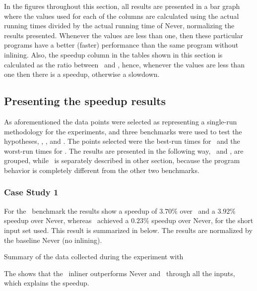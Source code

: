 
In the figures throughout this section, all results are presented in a bar graph where the values used for each of the columns are calculated using the actual running times divided by the actual running time of Never, normalizing the results presented. Whenever the values are less than one, then these particular programs have a better (faster) performance than the same program without inlining. Also, the speedup column in the tables shown in this section is calculated as the ratio between \FDI\ and \llvm, hence, whenever the values are less than one then there is a speedup, otherwise a slowdown.

\subsection{Presenting the speedup results}
\label{sec:speedupresult}

As aforementioned the data points were selected as representing a single-run methodology for the experiments, and three benchmarks were used to test the hypotheses, \bzip, \gzip, and \gcc. The points selected were the best-run times for \FDI\ and the worst-run times for \llvm. The results are presented in the following way, \bzip\ and \gzip, are grouped, while \gcc\ is separately described in other section, because the program behavior is completely different from the other two benchmarks.

\subsubsection{Case Study 1 \gcc}

For the \gcc\ benchmark the results show a speedup of $3.70 \%$ over \llvm\, and a $3.92 \%$ speedup over Never, whereas \llvm\ achieved a $0.23 \%$ speedup over Never, for the short input set used. This result is summarized in  below. The results are normalized by the baseline Never (no inlining).

\begin{table}
  \centering
  \begin{tiny}
  
  \end{tiny}
  \caption{Summary of the data collected during the experiment with \gcc}
  \label{tab:speedupgcc}
\end{table}

The  shows that the \FDI\ inliner outperforms Never and \llvm\ through all the inputs, which explains the speedup.

